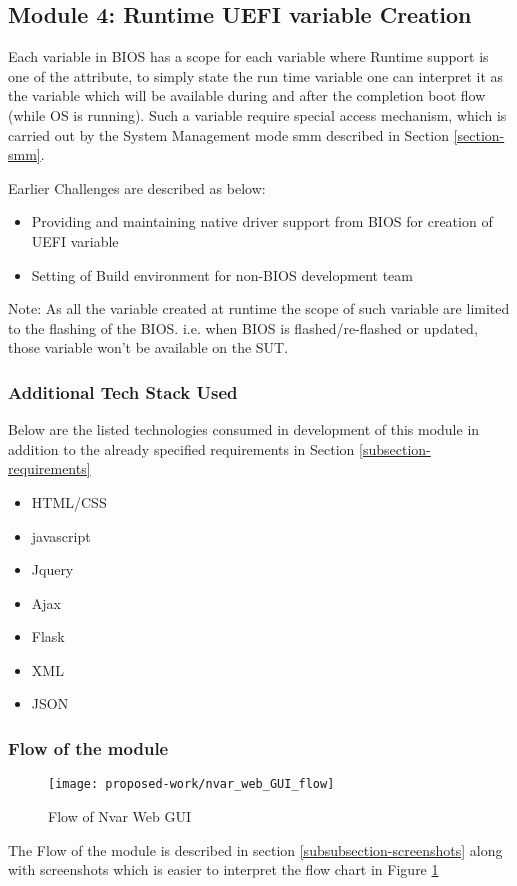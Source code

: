 \subsection{Module 4: Runtime UEFI variable Creation}\label{module-runtime-uefi-variable-creation}
Each variable in BIOS has a scope for each variable where Runtime support is one of the attribute, to simply state the run time variable one can interpret it as the variable which will be available during and after the completion boot flow (while OS is running). Such a variable require special access mechanism, which is carried out by the System Management mode \gls{smm} described in Section \ref{section-smm}.

Earlier Challenges are described as below:
\begin{itemize}
	\item Providing and maintaining native driver support from BIOS for creation of UEFI variable
	\item Setting of Build environment for non-BIOS development team
\end{itemize}

Note: As all the variable created at runtime the scope of such variable are limited to the flashing of the BIOS. i.e. when BIOS is flashed/re-flashed or updated, those variable won't be available on the SUT.

\subsubsection{Additional Tech Stack Used}
Below are the listed technologies consumed in development of this module in addition to the already specified requirements in Section \ref{subsection-requirements}
\begin{itemize}
	\item HTML/CSS
	\item javascript
	\item Jquery
	\item Ajax
	\item Flask
	\item XML
	\item JSON
\end{itemize}

\subsubsection{Flow of the module}
\begin{figure}[!htbp]
	\centering
	\texttt{[image: proposed-work/nvar\_web\_GUI\_flow]}
	\caption{Flow of Nvar Web GUI}\label{fig:nvar_web_GUI_flow}
\end{figure}
The Flow of the module is described in section \ref{subsubsection-screenshots} along with screenshots which is easier to interpret the flow chart in Figure \ref{fig:nvar_web_GUI_flow}


